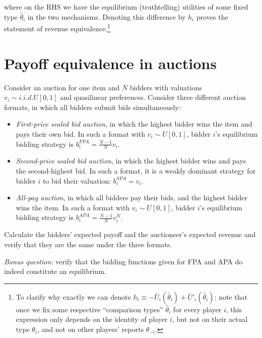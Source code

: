 \documentclass[a4paper]{article}
\newif\ifsolutions
\begin{document}
	where on the RHS we have the equilibrium (truthtelling) utilities of some fixed type $\hat{\theta}_i$ in the two mechanisms. Denoting this difference by $h_i$ proves the statement of revenue equivalence.\footnote{To clarify why exactly we can denote $h_i \equiv -\bar{U}_i(\hat{\theta}_i) + \bar{U}'_i(\hat{\theta}_i)$: note that once we fix some respective ``comparison types'' $\hat{\theta}_i$ for every player $i$, this expression only depends on the identity of player $i$, but not on their actual type $\theta_i$, and not on other players' reports $\theta_{-i}$.}
\fi



\section{Payoff equivalence in auctions}

Consider an auction for one item and $N$ bidders with valuations $v_i \sim i.i.d.U[0,1]$ and quasilinear preferences. Consider three different auction formats, in which all bidders submit bids simultaneously:
\begin{itemize}
	\item \emph{First-price sealed bid auction}, in which the highest bidder wins the item and pays their own bid. In such a format with $v_i \sim U[0,1]$, bidder $i$'s equilibrium bidding strategy is $b_i^{FPA} = \frac{N-1}{N} v_i$.
	\item \emph{Second-price sealed bid auction}, in which the highest bidder wins and pays the second-highest bid. In such a format, it is a weakly dominant strategy for bidder $i$ to bid their valuation: $b_i^{SPA} = v_i$.
	\item \emph{All-pay auction}, in which all bidders pay their bids, and the highest bidder wins the item. In such a format with $v_i \sim U[0,1]$, bidder $i$'s equilibrium bidding strategy is $b_i^{APA} = \frac{N-1}{N} v_i^N$.
\end{itemize}
Calculate the bidders' expected payoff and the auctioneer's expected revenue and verify that they are the same under the three formats.

\emph{Bonus question:} verify that the bidding functions given for FPA and APA do indeed constitute an equilibrium.

\ifsolutions
\section*{Solution}
See notes from class.
\fi 
\end{document}
